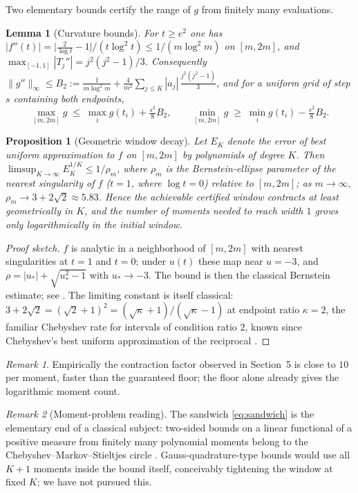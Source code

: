 \documentclass[11pt]{article}
\newtheorem{lemma}{Lemma}
\newtheorem{proposition}{Proposition}
\theoremstyle{remark}
\newtheorem{remark}{Remark}
\begin{document}
Two elementary bounds certify the range of $g$ from finitely many evaluations.

\begin{lemma}[Curvature bounds]\label{lem:curv}
For $t \ge e^2$ one has $|f''(t)| = \big|\tfrac{2}{\log t} - 1\big| \big/ (t \log^2 t) \le
1/(m \log^2 m)$ on $[m, 2m]$, and $\max_{[-1,1]} |T_j''| = j^2(j^2-1)/3$. Consequently
$\|g''\|_\infty \le B_2 := \frac{1}{m \log^2 m} + \frac{4}{m^2} \sum_{j \le K} |a_j|\,
\frac{j^2(j^2-1)}{3}$, and for a uniform grid of step $s$ containing both endpoints,
\[
\max_{[m,2m]} g \;\le\; \max_i g(t_i) + \tfrac{s^2}{8} B_2 , \qquad
\min_{[m,2m]} g \;\ge\; \min_i g(t_i) - \tfrac{s^2}{8} B_2 .
\]
\end{lemma}

\begin{proposition}[Geometric window decay]\label{prop:rate}
Let $E_K$ denote the error of best uniform approximation to $f$ on $[m,2m]$ by polynomials of degree
$K$. Then $\limsup_{K \to \infty} E_K^{1/K} \le 1/\rho_m$, where $\rho_m$ is the Bernstein-ellipse
parameter of the nearest singularity of $f$ ($t = 1$, where $\log t = 0$) relative to $[m,2m]$; as
$m \to \infty$, $\rho_m \to 3 + 2\sqrt{2} \approx 5.83$. Hence the achievable certified window
contracts at least geometrically in $K$, and the number of moments needed to reach width $1$ grows only
logarithmically in the initial window.
\end{proposition}

\begin{proof}[Proof sketch]
$f$ is analytic in a neighborhood of $[m, 2m]$ with nearest singularities at $t = 1$ and $t = 0$; under
$u(t)$ these map near $u = -3$, and $\rho = |u_\ast| + \sqrt{u_\ast^2 - 1}$ with $u_\ast \to -3$. The
bound is then the classical Bernstein estimate; see \cite[Ch.~8]{Tref}. The limiting constant is
itself classical: $3 + 2\sqrt{2} = (\sqrt{2}+1)^2 = (\sqrt{\kappa}+1)/(\sqrt{\kappa}-1)$ at endpoint
ratio $\kappa = 2$, the familiar Chebyshev rate for intervals of condition ratio $2$, known since
Chebyshev's best uniform approximation of the reciprocal \cite{KVZ}.
\end{proof}

\begin{remark}
Empirically the contraction factor observed in Section~5 is close to $10$ per moment, faster than the
guaranteed floor; the floor alone already gives the logarithmic moment count.
\end{remark}

\begin{remark}[Moment-problem reading]
The sandwich \eqref{eq:sandwich} is the elementary end of a classical subject: two-sided bounds on a
linear functional of a positive measure from finitely many polynomial moments belong to the
Chebyshev--Markov--Stieltjes circle \cite{KN,KS}. Gauss-quadrature-type bounds \cite{GM} would use all
$K{+}1$ moments inside the bound itself, conceivably tightening the window at fixed $K$; we have not
pursued this.
\end{remark}
\end{document}
